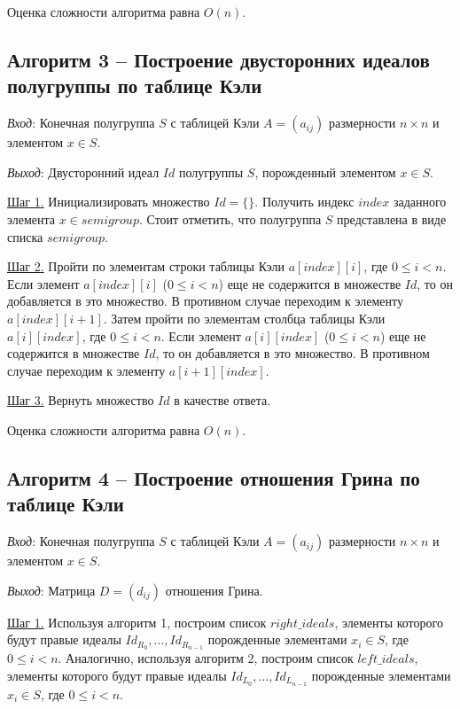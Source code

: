 \documentclass[bachelor, och, labwork]{shiza}
\begin{document}
      Оценка сложности алгоритма равна $O(n)$.

      \subsection{Алгоритм 3 -- Построение двусторонних идеалов полугруппы по таблице Кэли}

    \textit{Вход}: Конечная полугруппа $S$ с таблицей Кэли $A = (a_{ij})$ размерности $n \times n$ и элементом $x \in S$.

    \textit{Выход}: Двусторонний идеал $Id$ полугруппы $S$, порожденный элементом $x \in S$.
    
    \underline{Шаг 1.} Инициализировать множество $Id = \{\}$. Получить индекс $index$ заданного элемента $x \in semigroup$.
    Стоит отметить, что полугруппа $S$ представлена в виде списка $semigroup$.
    
    \underline{Шаг 2.} Пройти по элементам строки таблицы Кэли $a[index][i]$, где $0 \leq i < n$. Если элемент $a[index][i]$ ($0 \leq i < n$) еще не содержится
    в множестве $Id$, то он добавляется в это множество. В противном случае переходим к элементу $a[index][i + 1]$. Затем пройти по элементам столбца
    таблицы Кэли $a[i][index]$, где $0 \leq i < n$. Если элемент $a[i][index]$ ($0 \leq i < n$) еще не содержится в множестве $Id$, то он добавляется
    в это множество. В противном случае переходим к элементу $a[i + 1][index]$.
    
    \underline{Шаг 3.} Вернуть множество $Id$ в качестве ответа.
    
      Оценка сложности алгоритма равна $O(n)$.


    \subsection{Алгоритм 4 -- Построение отношения Грина по таблице Кэли}

    \textit{Вход}: Конечная полугруппа $S$ с таблицей Кэли $A = (a_{ij})$ размерности $n \times n$ и элементом $x \in S$.

    \textit{Выход}: Матрица $D = (d_{ij})$ отношения Грина.
    
    \underline{Шаг 1.} Используя алгоритм 1, построим список $right\_ideals$, элементы которого будут правые идеалы $Id_{R_0}, \dots, Id_{R_{n-1}}$ порожденные
    элементами $x_i \in S$, где $0 \leq i < n$. Аналогично, используя алгоритм 2, построим список $left\_ideals$, элементы которого будут правые идеалы
    $Id_{L_0}, \dots, Id_{L_{n-1}}$ порожденные элементами $x_i \in S$, где $0 \leq i < n$.
    
\end{document}
